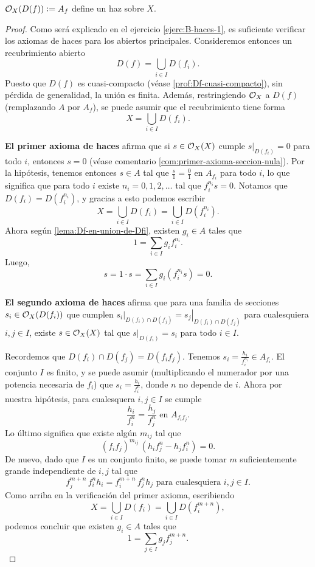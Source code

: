 \documentclass{article}
\numberwithin{equation}{section}
\theoremstyle{definition}
\begin{document}
\begin{teorema}
  $\mathcal{O}_X (D (f)) \mathrel{\mathop:}= A_f$ define un haz sobre $X$.

  \begin{proof}
    Como será explicado en el ejercicio \ref{ejerc:B-haces-1}, es suficiente
    verificar los axiomas de haces para los abiertos principales. Consideremos
    entonces un recubrimiento abierto
    $$D (f) = \bigcup_{i\in I} D (f_i).$$
    Puesto que $D (f)$ es cuasi-compacto (véase \ref{prof:Df-cuasi-compacto}),
    sin pérdida de generalidad, la unión es finita. Además, restringiendo $\mathcal{O}_X$
    a $D (f)$ (remplazando $A$ por $A_f$), se puede asumir que el recubrimiento
    tiene forma
    $$X = \bigcup_{i\in I} D (f_i).$$

    \vspace{1em}

    \textbf{El primer axioma de haces} afirma que si $s \in \mathcal{O}_X (X)$ cumple
    $\left.s\right|_{D (f_i)} = 0$ para todo $i$, entonces $s = 0$
    (véase comentario \ref{com:primer-axioma-seccion-nula}). Por la hipótesis,
    tenemos entonces $s \in A$ tal que $\frac{s}{1} = \frac{0}{1}$ en $A_{f_i}$
    para todo $i$, lo que significa que para todo $i$ existe
    $n_i = 0,1,2,\ldots$ tal que $f_i^{n_i} s = 0$. Notamos que
    $D (f_i) = D (f_i^{n_i})$, y gracias a esto podemos escribir
    $$X = \bigcup_{i\in I} D (f_i) = \bigcup_{i\in I} D (f_i^{n_i}).$$
    Ahora según \ref{lema:Df-en-union-de-Dfi}, existen $g_i \in A$ tales que
    $$1 = \sum_{i\in I} g_i f_i^{n_i}.$$
    Luego,
    $$s = 1\cdot s = \sum_{i\in I} g_i (f_i^{n_i} s) = 0.$$

    \vspace{1em}

    \textbf{El segundo axioma de haces} afirma que para una familia de secciones
    $s_i \in \mathcal{O}_X (D (f_i))$ que cumplen
    $\left.s_i\right|_{D (f_i) \cap D (f_j)} = \left.s_j\right|_{D (f_i) \cap D
      (f_j)}$ para cualesquiera $i,j\in I$, existe $s \in \mathcal{O}_X (X)$ tal que
    $\left.s\right|_{D (f_i)} = s_i$ para todo $i\in I$.

    Recordemos que $D (f_i) \cap D (f_j) = D (f_i f_j)$. Tenemos
    $s_i = \frac{h_i}{f_i^{n_i}} \in A_{f_i}$. El conjunto $I$ es finito,
    y se puede asumir (multiplicando el numerador por una potencia necesaria de
    $f_i$) que $s_i = \frac{h_i}{f_i^n}$, donde $n$ no depende de $i$. Ahora por
    nuestra hipótesis, para cualesquera $i,j\in I$ se cumple
    $$\frac{h_i}{f_i^n} = \frac{h_j}{f_j^n} \text{ en }A_{f_i f_j}.$$
    Lo último significa que existe algún $m_{ij}$ tal que
    $$(f_i f_j)^{m_{ij}} \, (h_i f_j^n - h_j f_i^n) = 0.$$
    De nuevo, dado que $I$ es un conjunto finito, se puede tomar $m$
    suficientemente grande independiente de $i,j$ tal que
    \[ \tag{*} f_j^{m+n} \, f_i^n h_i = f_i^{m+n} \, f_j^n h_j
       \text{ para cualesquiera }i,j\in I. \]
    Como arriba en la verificación del primer axioma, escribiendo
    $$X = \bigcup_{i\in I} D (f_i) = \bigcup_{i\in I} D (f_i^{m+n}),$$
    podemos concluir que existen $g_i \in A$ tales que
    \[ \tag{**} 1 = \sum_{j\in I} g_j f_j^{m+n}. \]


\end{proof}
\end{teorema}
\end{document}
